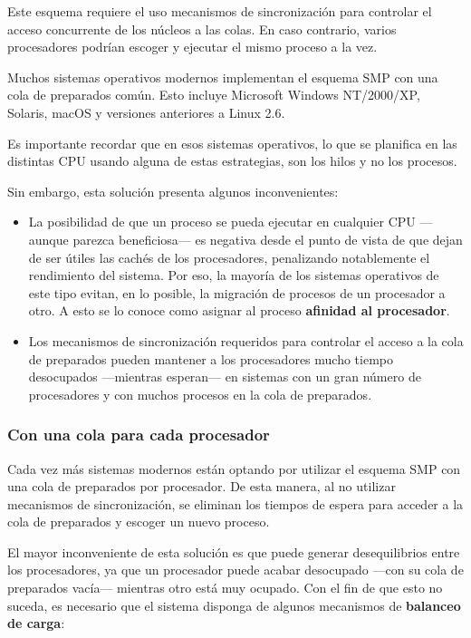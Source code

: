 Este esquema requiere el uso mecanismos de sincronización para controlar
el acceso concurrente de los núcleos a las colas. En caso contrario,
varios procesadores podrían escoger y ejecutar el mismo proceso a la
vez.

Muchos sistemas operativos modernos implementan el esquema SMP con una
cola de preparados común. Esto incluye Microsoft Windows NT/2000/XP,
Solaris, macOS y versiones anteriores a Linux 2.6.

Es importante recordar que en esos sistemas operativos, lo que se
planifica en las distintas CPU usando alguna de estas estrategias, son
los hilos y no los procesos.

Sin embargo, esta solución presenta algunos inconvenientes:

\begin{itemize}
\item
  La posibilidad de que un proceso se pueda ejecutar en cualquier CPU
  ---aunque parezca beneficiosa--- es negativa desde el punto de vista
  de que dejan de ser útiles las cachés de los procesadores, penalizando
  notablemente el rendimiento del sistema. Por eso, la mayoría de los
  sistemas operativos de este tipo evitan, en lo posible, la migración
  de procesos de un procesador a otro. A esto se lo conoce como asignar
  al proceso \textbf{{}afinidad al procesador}.
\item
  Los mecanismos de sincronización requeridos para controlar el acceso a
  la cola de preparados pueden mantener a los procesadores mucho tiempo
  desocupados ---mientras esperan--- en sistemas con un gran número de
  procesadores y con muchos procesos en la cola de preparados.
\end{itemize}

\subsubsection{Con una cola para cada
procesador}\label{_con_una_cola_para_cada_procesador}

Cada vez más sistemas modernos están optando por utilizar el esquema SMP
con una cola de preparados por procesador. De esta manera, al no
utilizar mecanismos de sincronización, se eliminan los tiempos de espera
para acceder a la cola de preparados y escoger un nuevo proceso.

El mayor inconveniente de esta solución es que puede generar
desequilibrios entre los procesadores, ya que un procesador puede acabar
desocupado ---con su cola de preparados vacía--- mientras otro está muy
ocupado. Con el fin de que esto no suceda, es necesario que el sistema
disponga de algunos mecanismos de \textbf{balanceo de carga}:

